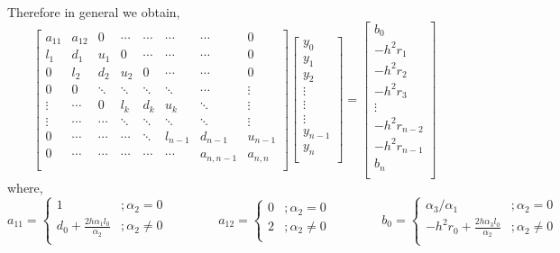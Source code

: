 \documentclass[12pt]{article}
\begin{document}
	Therefore in general we obtain, 
	\begin{equation} \label{sys_gen}
		\left[ \begin{matrix}
			a_{11} & a_{12} & 0 & \cdots &\cdots &\cdots&\cdots& 0\\
			l_1 & d_1 & u_1 & 0 &\cdots &\cdots&\cdots& 0\\
			0&l_2 & d_2 & u_2 &0 &\cdots&\cdots& 0\\
			0&0 & \ddots & \ddots &\ddots &\ddots&\cdots & \vdots\\
			\vdots&\cdots&0&l_k & d_k & u_k &\ddots& \vdots\\
			\vdots&\cdots&\cdots&\ddots & \ddots & \ddots &\ddots& \vdots\\
			0&\cdots&\cdots& \cdots&\ddots & l_{n-1} &d_{n-1}& u_{n-1}\\
			0&\cdots&\cdots& \cdots&\cdots & \cdots & a_{n,n-1} & a_{n,n} \\
		\end{matrix} \right]
		\left[ \begin{matrix}
			y_0\\
			y_1\\
			y_2\\
			\vdots\\
			\vdots\\
			\vdots\\
			y_{n-1}\\
			y_{n}\\
		\end{matrix} \right] =
		\left[ \begin{matrix}
			b_0 \\
			- h^2 r_1\\
			- h^2 r_2\\
			- h^2 r_3\\
			\vdots\\
			- h^2 r_{n-2}\\
			- h^2 r_{n-1}\\
			b_n \\
		\end{matrix} \right]
	\end{equation}
	where,
	\begin{equation}\label{edges}
		a_{11} = \left\{ \begin{array}{cr}
				1 &; \alpha_2 = 0 \\[3mm]
			\displaystyle	d_0 + \frac{2h \alpha_1 l_0}{\alpha_2} &; \alpha_2 \neq 0 \\
			\end{array} \right.
		\qquad\qquad
		a_{12} = \left\{ \begin{array}{cr}
			0 &; \alpha_2 = 0 \\[3mm]
			2 &; \alpha_2 \neq 0 \\
		\end{array} \right.
		\qquad\qquad
		b_0 = \left\{ \begin{array}{cr}
			\alpha_3/\alpha_1 &; \alpha_2 = 0 \\[3mm]
			\displaystyle -h^2r_0 + \frac{2h \alpha_3 l_0}{\alpha_2} &; \alpha_2 \neq 0 \\
	\end{array} \right.
	\end{equation}
\end{document}
